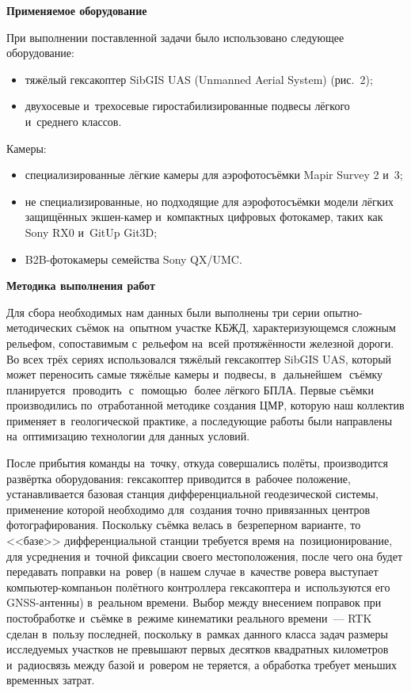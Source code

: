 \textbf{Применяемое оборудование}

При выполнении поставленной задачи было использовано следующее оборудование:

\begin{itemize}[noitemsep]\vspace{-8pt}
\item тяжёлый гексакоптер SibGIS UAS (Unmanned Aerial System) (рис.~2);
\item двухосевые и~трехосевые гиростабилизированные подвесы лёгкого и~среднего классов.
\end{itemize}
\vspace{-8pt}



Камеры:

\begin{itemize}[noitemsep]\vspace{-8pt}
\item специализированные лёгкие камеры для аэрофотосъёмки Mapir Survey 2 и~3;
\item не специализированные, но подходящие для аэрофотосъёмки модели лёгких защищённых экшен-камер и~компактных цифровых фотокамер, таких как Sony RX0 и~GitUp Git3D;
\item B2B-фотокамеры семейства Sony QX/UMC.
\end{itemize}
\vspace{-8pt}

\textbf{Методика выполнения работ}

Для сбора необходимых нам данных были выполнены три серии опытно-методических съёмок на~опытном участке КБЖД, характеризующемся сложным рельефом, сопоставимым с~рельефом на~всей протяжённости железной дороги. Во всех трёх сериях использовался тяжёлый гексакоптер SibGIS UAS, который может переносить самые тяжёлые камеры и~подвесы, в\,\,\,\,дальнейшем\,\,\,\,съёмку\,\,\,\,планируется\,\,\,\,проводить\,\,\,\,с\,\,\,\,помощью\,\,\,\,более лёгкого БПЛА. Первые съёмки производились по~отработанной методике создания ЦМР, которую наш коллектив применяет в~геологической практике, а последующие работы были направлены на~оптимизацию технологии для данных условий.

После прибытия команды на~точку, откуда совершались полёты, производится развёртка оборудования: гексакоптер приводится в~рабочее положение, устанавливается базовая станция дифференциальной геодезической системы, применение которой необходимо для~создания точно привязанных центров фотографирования. Поскольку съёмка велась в~безреперном варианте, то <<базе>> дифференциальной станции требуется время на~позиционирование, для усреднения и~точной фиксации своего местоположения, после чего она будет передавать поправки на~ровер (в нашем случае в~качестве ровера выступает компьютер-компаньон полётного контроллера гексакоптера и~используются его GNSS-антенны) в~реальном времени. Выбор между внесением поправок при постобработке и~съёмке в~режиме кинематики реального времени~--- RTK сделан в~пользу последней, поскольку в~рамках данного класса задач размеры исследуемых участков не превышают первых десятков квадратных километров и~радиосвязь между базой и~ровером не теряется, а обработка требует меньших временных затрат.

